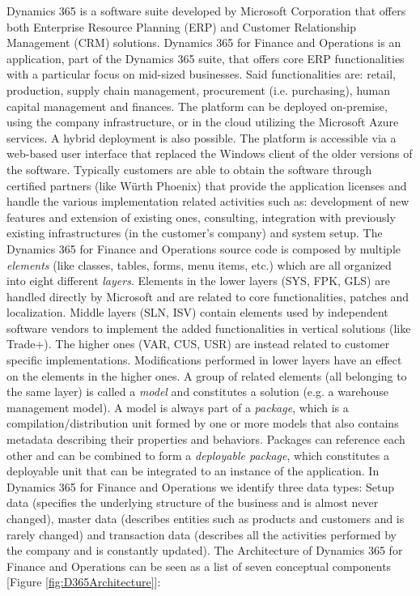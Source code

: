 Dynamics 365 is a software suite developed by Microsoft Corporation that offers both Enterprise Resource Planning (ERP) and Customer Relationship Management (CRM) solutions. Dynamics 365 for Finance and Operations \cite{D365Book} is an application, part of the Dynamics 365 suite, that offers core ERP functionalities with a particular focus on mid-sized businesses. Said functionalities are: retail, production, supply chain management, procurement (i.e. purchasing), human capital management and finances. The platform can be deployed on-premise, using the company infrastructure, or in the cloud utilizing the Microsoft Azure services. A hybrid deployment is also possible. The platform is accessible via a web-based user interface that replaced the Windows client of the older versions of the software. Typically customers are able to obtain the software through certified partners (like Würth Phoenix) that provide the application licenses and handle the various implementation related activities such as: development of new features and extension of existing ones, consulting, integration with previously existing infrastructures (in the customer's company) and system setup. The Dynamics 365 for Finance and Operations source code is composed by multiple \textit{elements} (like classes, tables, forms, menu items, etc.) which are all organized into eight different \textit{layers}. Elements in the lower layers (SYS, FPK, GLS) are handled directly by Microsoft and are related to core functionalities, patches and localization. Middle layers (SLN, ISV) contain elements used by independent software vendors to implement the added functionalities in vertical solutions (like Trade+).  The higher ones (VAR, CUS, USR) are instead related to customer specific implementations. Modifications performed in lower layers have an effect on the elements in the higher ones. A group of related elements (all belonging to the same layer) is called a \textit{model} and constitutes a solution (e.g. a warehouse management model). A model is always part of a \textit{package}, which is a compilation/distribution unit formed by one or more models that also contains metadata describing their properties and behaviors. Packages can reference each other and can be combined to form a \textit{deployable package}, which constitutes a deployable unit that can be integrated to an instance of the application. In Dynamics 365 for Finance and Operations we identify three data types: Setup data (specifies the underlying structure of the business and is almost never changed), master data (describes entities such as products and customers and is rarely changed) and transaction data (describes all the activities performed by the company and is constantly updated). The Architecture \cite{D365Book2} of Dynamics 365 for Finance and Operations can be seen as a list of seven conceptual components [Figure \ref{fig:D365Architecture}]:

